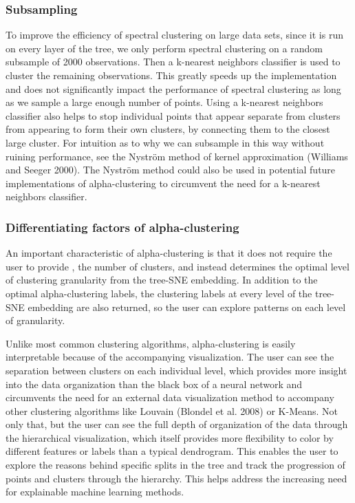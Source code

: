 \documentclass{article}
\begin{document}
\subsubsection{Subsampling}

To improve the efficiency of spectral clustering on large data sets, since it is run on every layer of the tree, we only perform spectral clustering on a random subsample of 2000 observations. Then a k-nearest neighbors classifier is used to cluster the remaining observations. This greatly speeds up the implementation and does not significantly impact the performance of spectral clustering as long as we sample a large enough number of points. Using a k-nearest neighbors classifier also helps to stop individual points that appear separate from clusters from appearing to form their own clusters, by connecting them to the closest large cluster. For intuition as to why we can subsample in this way without ruining performance, see the Nyström method of kernel approximation (Williams and Seeger 2000). The Nyström method could also be used in potential future implementations of alpha-clustering to circumvent the need for a k-nearest neighbors classifier.

\subsubsection{Differentiating factors of alpha-clustering}

An important characteristic of alpha-clustering is that it does not require the user to provide , the number of clusters, and instead determines the optimal level of clustering granularity from the tree-SNE embedding. In addition to the optimal alpha-clustering labels, the clustering labels at every level of the tree-SNE embedding are also returned, so the user can explore patterns on each level of granularity.

Unlike most common clustering algorithms, alpha-clustering is easily interpretable because of the accompanying visualization. The user can see the separation between clusters on each individual level, which provides more insight into the data organization than the black box of a neural network and circumvents the need for an external data visualization method to accompany other clustering algorithms like Louvain (Blondel et al. 2008) or K-Means. Not only that, but the user can see the full depth of organization of the data through the hierarchical visualization, which itself provides more flexibility to color by different features or labels than a typical dendrogram. This enables the user to explore the reasons behind specific splits in the tree and track the progression of points and clusters through the hierarchy. This helps address the increasing need for explainable machine learning methods.
\end{document}
